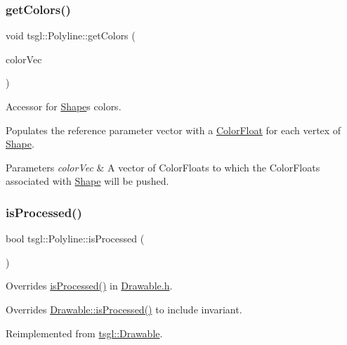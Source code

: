 \subsubsection{\texorpdfstring{get\+Colors()}{getColors()}}
{\footnotesize\ttfamily void tsgl\+::\+Polyline\+::get\+Colors (\begin{DoxyParamCaption}\item[{std\+::vector$<$ \hyperlink{structtsgl_1_1_color_float}{Color\+Float} $>$ \&}]{color\+Vec }\end{DoxyParamCaption})\hspace{0.3cm}{\ttfamily [virtual]}}



Accessor for \hyperlink{classtsgl_1_1_shape}{Shape}\textquotesingle{}s colors. 

Populates the reference parameter vector with a \hyperlink{structtsgl_1_1_color_float}{Color\+Float} for each vertex of \hyperlink{classtsgl_1_1_shape}{Shape}. 
\begin{DoxyParams}{Parameters}
{\em color\+Vec} & A vector of Color\+Floats to which the Color\+Floats associated with \hyperlink{classtsgl_1_1_shape}{Shape} will be pushed. \\
\hline
\end{DoxyParams}
\mbox{\label{classtsgl_1_1_polyline_a9ce8dd308664600c31ef0047908c31d5}} 
\subsubsection{\texorpdfstring{is\+Processed()}{isProcessed()}}
{\footnotesize\ttfamily bool tsgl\+::\+Polyline\+::is\+Processed (\begin{DoxyParamCaption}{ }\end{DoxyParamCaption})\hspace{0.3cm}{\ttfamily [virtual]}}



Overrides \hyperlink{classtsgl_1_1_polyline_a9ce8dd308664600c31ef0047908c31d5}{is\+Processed()} in \hyperlink{_drawable_8h_source}{Drawable.\+h}. 

Overrides \hyperlink{classtsgl_1_1_drawable_a98562ec95c8621ba9b46d7bd0c0ffece}{Drawable\+::is\+Processed()} to include invariant. 

Reimplemented from \hyperlink{classtsgl_1_1_drawable_a98562ec95c8621ba9b46d7bd0c0ffece}{tsgl\+::\+Drawable}.

